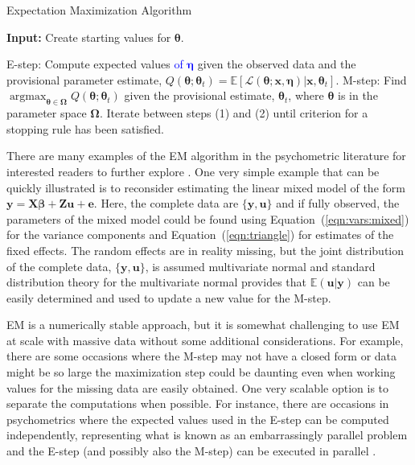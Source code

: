 \documentclass[12pt]{article}
\DeclareMathOperator*{\argmax}{argmax}
\begin{document}
\begin{algorithm}
\caption{Expectation Maximization Algorithm}
\label{algo:em}
	\hspace*{\algorithmicindent} \textbf{Input:} Create starting values for $\bm{\theta}$.
\begin{algorithmic}[1]
	\State E-step: Compute expected values \textcolor{blue}{of $\bm{\eta}$} given the observed data and the provisional parameter estimate, $Q(\bm{\theta};\bm{\theta}_t) = \mathbb{E}[\mathcal{L}(\bm{\theta};\bm{x},\bm{\eta})|\bm{x},\bm{\theta}_t]$.
	\State M-step: Find $\argmax_{\bm{\theta} \in \bm{\Omega}} Q(\bm{\theta};\bm{\theta}_t)$ given the provisional estimate, $\bm{\theta}_t$, where $\bm{\theta}$ is in the parameter space $\bm{\Omega}$.
	\State Iterate between steps (1) and (2) until criterion for a stopping rule has been satisfied. 
\end{algorithmic}
\end{algorithm}

There are many examples of the EM algorithm in the psychometric literature for interested readers to further explore \cite{Hsu1999TheRB}. One very simple example that can be quickly illustrated is to reconsider estimating the linear mixed model of the form $\bm{y} = \bm{X}\bm{\beta} + \bm{Z}\bm{u} + \bm{e}$. Here, the complete data are $\{\bm{y}, \bm{u}\}$ and if fully observed, the parameters of the mixed model could be found using Equation~(\ref{eqn:vars:mixed}) for the variance components and Equation~(\ref{eqn:triangle}) for estimates of the fixed effects. The random effects are in reality missing, but the joint distribution of the complete data, $\{\bm{y}, \bm{u}\}$, is assumed multivariate normal and standard distribution theory for the multivariate normal provides that $\mathbb{E}(\bm{u}|\bm{y})$ can be easily determined \cite{mcandsearle:2001} and used to update a new value for the M-step.  


EM is a numerically stable approach, but it is somewhat challenging to use EM at scale with massive data without some additional considerations. For example, there are some occasions where the M-step may not have a closed form or data might be so large the maximization step could be daunting even when working values for the missing data are easily obtained. One very scalable option is to separate the computations when possible. For instance, there are occasions in psychometrics where the expected values used in the E-step can be computed independently, representing what is known as an embarrassingly parallel problem and the E-step (and possibly also the M-step) can be executed in parallel \cite{lee,robitzsch,Davier2016HighPerformancePT}. 
\end{document}
